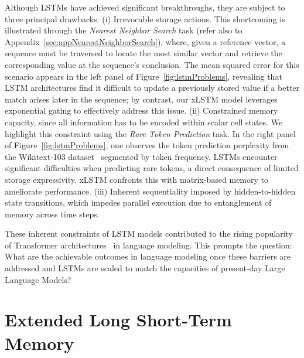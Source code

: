 Although LSTMs have achieved significant breakthroughs, they are subject to three principal drawbacks: (i) Irrevocable storage actions. This shortcoming is illustrated through the {\it Nearest Neighbor Search} task (refer also to Appendix~\ref{sec:appNearestNeighborSearch}), where, given a reference vector, a sequence must be traversed to locate the most similar vector and retrieve the corresponding value at the sequence’s conclusion. The mean squared error for this scenario appears in the left panel of Figure~\ref{fig:lstmProblems}, revealing that LSTM architectures find it difficult to update a previously stored value if a better match arises later in the sequence; by contrast, our xLSTM model leverages exponential gating to effectively address this issue. (ii) Constrained memory capacity, since all information has to be encoded within scalar cell states. We highlight this constraint using the {\it Rare Token Prediction} task. In the right panel of Figure~\ref{fig:lstmProblems}, one observes the token prediction perplexity from the Wikitext-103 dataset~\citep{Merity:17} segmented by token frequency. LSTMs encounter significant difficulties when predicting rare tokens, a direct consequence of limited storage expressivity. xLSTM confronts this with matrix-based memory to ameliorate performance. (iii) Inherent sequentiality imposed by hidden-to-hidden state transitions, which impedes parallel execution due to entanglement of memory across time steps.

These inherent constraints of LSTM models contributed to the rising popularity of Transformer architectures~\citep{Vaswani:17} in language modeling. This prompts the question: What are the achievable outcomes in language modeling once these barriers are addressed and LSTMs are scaled to match the capacities of present-day Large Language Models?

\section{Extended Long Short-Term Memory}
\label{sec:xLSTM}

